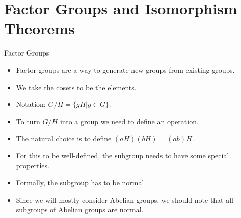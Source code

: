 \documentclass[ %
 10pt, xcolor={dvipsnames,svgnames,x11names,hyperref},
   hyperref={colorlinks=true,citecolor=green,linkcolor=DarkRed,urlcolor=ProcessBlue,anchorcolor=blue}
  ]{beamer}
\newenvironment{stepitemize}{\begin{itemize}[<+->]}{\end{itemize} }
\begin{document}
\section{Factor Groups and Isomorphism Theorems}

\begin{frame}{Factor Groups}
    \begin{stepitemize}
    \item Factor groups are a way to generate new groups from existing groups.
    \item We take the cosets to be the elements.
    \item Notation: $G/H = \{gH|g\in G\}$.
    \item To turn $G/H$ into a group we need to define an operation.
    \item The natural choice is to define $(aH)(bH) = (ab)H$.
    \item For this to be well-defined, the subgroup needs to have some special properties.
    \item Formally, the subgroup has to be normal
    \item Since we will mostly consider Abelian groups, we should note that all subgroups of Abelian groups are normal.
    \end{stepitemize}
\end{frame}
\end{document}

